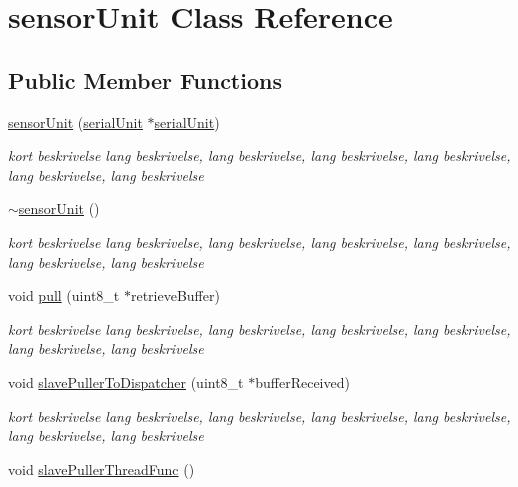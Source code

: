 \hypertarget{classsensorUnit}{}\section{sensor\+Unit Class Reference}
\label{classsensorUnit}
\subsection*{Public Member Functions}
\begin{DoxyCompactItemize}
\item 
\hyperlink{classsensorUnit_a820a3a2b5353cbb927c109d45c194541}{sensor\+Unit} (\hyperlink{classserialUnit}{serial\+Unit} $\ast$\hyperlink{classserialUnit}{serial\+Unit})
\begin{DoxyCompactList}\small\item\em kort beskrivelse lang beskrivelse, lang beskrivelse, lang beskrivelse, lang beskrivelse, lang beskrivelse, lang beskrivelse \end{DoxyCompactList}\item 
\hyperlink{classsensorUnit_a1e606f860650fc1d62af09b7423a299d}{$\sim$sensor\+Unit} ()
\begin{DoxyCompactList}\small\item\em kort beskrivelse lang beskrivelse, lang beskrivelse, lang beskrivelse, lang beskrivelse, lang beskrivelse, lang beskrivelse \end{DoxyCompactList}\item 
void \hyperlink{classsensorUnit_ad5a61b8eb08a866d7a94c7bb4149a172}{pull} (uint8\+\_\+t $\ast$retrieve\+Buffer)
\begin{DoxyCompactList}\small\item\em kort beskrivelse lang beskrivelse, lang beskrivelse, lang beskrivelse, lang beskrivelse, lang beskrivelse, lang beskrivelse \end{DoxyCompactList}\item 
void \hyperlink{classsensorUnit_af089bd3cff5b63b7bc287cff2a7fb90f}{slave\+Puller\+To\+Dispatcher} (uint8\+\_\+t $\ast$buffer\+Received)
\begin{DoxyCompactList}\small\item\em kort beskrivelse lang beskrivelse, lang beskrivelse, lang beskrivelse, lang beskrivelse, lang beskrivelse, lang beskrivelse \end{DoxyCompactList}\item 
void \hyperlink{classsensorUnit_af597dff1d9bc84a5ab9b1b76ca38f00e}{slave\+Puller\+Thread\+Func} ()

\end{DoxyCompactItemize}
